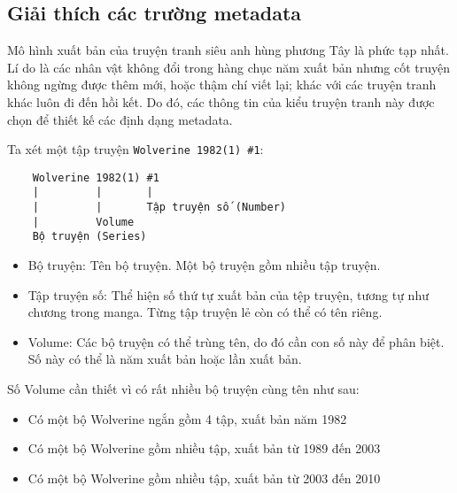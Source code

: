 \documentclass[../../../thesis]{subfiles}
\begin{document}
\begin{appendices}

\appendixpageoff


\chapter{Giải thích các trường metadata}

Mô hình xuất bản của truyện tranh siêu anh hùng phương Tây là phức tạp nhất. Lí
do là các nhân vật không đổi trong hàng chục năm xuất bản nhưng cốt truyện không
ngừng được thêm mới, hoặc thậm chí viết lại; khác với các truyện tranh khác luôn
đi đến hồi kết. Do đó, các thông tin của kiểu truyện tranh này được chọn để
thiết kế các định dạng metadata.

Ta xét một tập truyện \texttt{Wolverine\ 1982(1)\ \#1}:

\begin{verbatim}
    Wolverine 1982(1) #1
    |         |       |
    |         |       Tập truyện số (Number)
    |         Volume
    Bộ truyện (Series)
\end{verbatim}

\begin{itemize}
    \item
        Bộ truyện: Tên bộ truyện. Một bộ truyện gồm nhiều tập truyện.
    \item
        Tập truyện số: Thể hiện số thứ tự xuất bản của tệp truyện, tương tự như
        chương trong manga. Từng tập truyện lẻ còn có thể có tên riêng.
    \item
        Volume: Các bộ truyện có thể trùng tên, do đó cần con số này để phân
        biệt. Số này có thể là năm xuất bản hoặc lần xuất bản.
\end{itemize}

Số Volume cần thiết vì có rất nhiều bộ truyện cùng tên như sau:

\begin{itemize}
    \item
        Có một bộ Wolverine ngắn gồm 4 tập, xuất bản năm 1982
    \item
        Có một bộ Wolverine gồm nhiều tập, xuất bản từ 1989 đến 2003
    \item
        Có một bộ Wolverine gồm nhiều tập, xuất bản từ 2003 đến 2010
\end{itemize}


\end{appendices}
\end{document}
